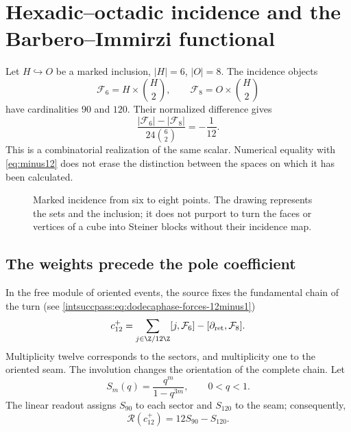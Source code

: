 \section{Hexadic--octadic incidence and the Barbero--Immirzi functional}
\label{sec:barbero}
Let $H\hookrightarrow O$ be a marked inclusion, $|H|=6$, $|O|=8$.
The incidence objects
\[
\mathcal F_6=H\times\binom H2,\qquad
\mathcal F_8=O\times\binom H2
\]
have cardinalities $90$ and $120$. Their normalized difference gives
\[
\frac{|\mathcal F_6|-|\mathcal F_8|}{24\binom62}=-\frac1{12}.
\]
This is a combinatorial realization of the same scalar.
Numerical equality with \eqref{eq:minus12} does not erase
the distinction between the spaces on which it has been calculated.

\begin{figure}[htbp]
\centering
{}
\caption{Marked incidence from six to eight points. The drawing represents
the sets and the inclusion; it does not purport to turn the faces or vertices
of a cube into Steiner blocks without their incidence map.}
\end{figure}

\subsection{The weights precede the pole coefficient}
In the free module of oriented events, the source fixes the fundamental
chain of the turn (see \ref{intsuccpass:eq:dodecaphase-forces-12minus1})
\[
c_{12}^{+}=
\sum_{j\in\Z/12\Z}[j,\mathcal F_6]
-[\partial_{\rm ret},\mathcal F_8].
\]
Multiplicity twelve corresponds to the sectors, and multiplicity one
to the oriented seam. The involution changes the orientation of the complete
chain. Let
\[
S_m(q)=\frac{q^m}{1-q^{3m}},\qquad 0<q<1.
\]
The linear readout assigns $S_{90}$ to each sector and $S_{120}$ to the seam;
consequently,
\[
\mathscr R(c_{12}^{+})=12S_{90}-S_{120}.
\]

